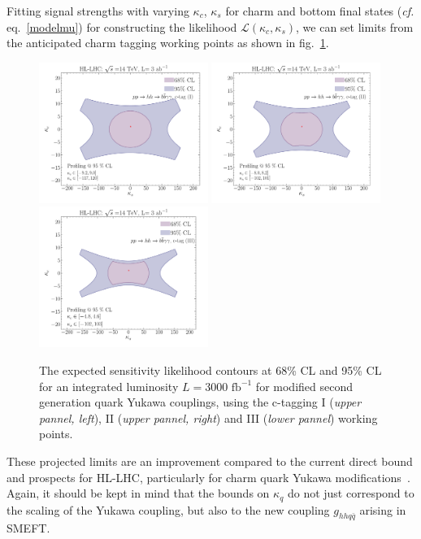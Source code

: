 %
%
%
%
Fitting  signal strengths with varying $\kappa_c$,  $\kappa_s$ for charm and bottom final states (\textit{cf.} eq.~\eqref{modelmu}) for constructing the likelihood $\mathscr{L}(\kappa_c,\kappa_s)$, we can set limits from the anticipated charm tagging working points as shown in fig.~\ref{bounds_2ndgen1}.
\begin{figure}[!t]
	\centering
	\includegraphics[width = 0.49\textwidth]{./fig/2nd_gen_exclusion_ctag1}
	\includegraphics[width = 0.49\textwidth]{./fig/2nd_gen_exclusion_ctag2}
	\centering
	\includegraphics[width = 0.49\textwidth]{./fig/2nd_gen_exclusion_ctag3}
	\caption{The expected sensitivity likelihood contours at 68\% CL and 95\% CL for an integrated luminosity $L=3000\text{ fb}^{-1}$ for modified second generation quark Yukawa couplings, using the c-tagging I (\textit{upper pannel, left}), II (\textit{upper pannel, right}) and III (\textit{lower pannel}) working points. }
	\label{bounds_2ndgen1}
\end{figure}
These projected limits are an improvement compared to the current direct bound and prospects for HL-LHC, particularly for charm quark Yukawa modifications~\cite{Perez:2015aoa,Perez:2015lra}.
Again, it should be kept in mind that the bounds on $\kappa_q$ do not just correspond to the scaling of the Yukawa coupling, but also to the new coupling $g_{hhq\bar{q}}$ arising in SMEFT.

